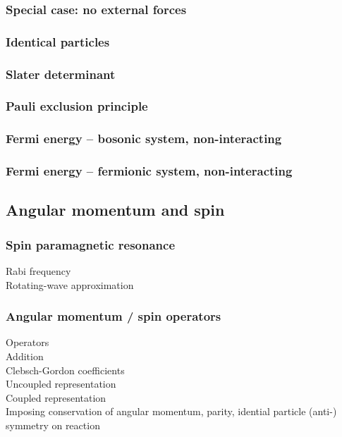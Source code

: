 \documentclass[letterpaper,landscape,10pt]{article}
\begin{document}
{\begin{multicols}{4}
	\subsubsection*{Special case: no external forces}
	\subsubsection*{Identical particles}
	\subsubsection*{Slater determinant}
	\subsubsection*{Pauli exclusion principle}
	\subsubsection*{Fermi energy -- bosonic system, non-interacting}
	\subsubsection*{Fermi energy -- fermionic system, non-interacting}
  \subsection*{Angular momentum and spin}
  	\subsubsection*{Spin paramagnetic resonance}
		\hspace{5pt} Rabi frequency \\
		\hspace{5pt} Rotating-wave approximation \\
  	\subsubsection*{Angular momentum / spin operators}
		\hspace{5pt} Operators \\
		\hspace{5pt} Addition \\
		\hspace{5pt} Clebsch-Gordon coefficients \\
		\hspace{5pt} Uncoupled representation \\
		\hspace{5pt} Coupled representation \\
		\hspace{5pt} Imposing conservation of angular momentum, parity, idential particle (anti-) symmetry on reaction \\

\end{multicols}}
\end{document}
